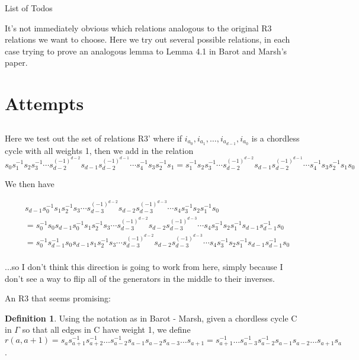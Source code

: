 \documentclass[11pt]{amsart}
\makeatletter
\theoremstyle{definition}
\newtheorem{defn}[thm]{Definition}
\def\listtodoname{List of Todos}
\def\listoftodos{\@starttoc{tdo}\listtodoname}
\makeatother
\begin{document}
\listoftodos
\newpage

It's not immediately obvious which relations analogous to the original R3 relations we want to choose.  Here we try out several possible relations, in each case trying to prove an analogous lemma to Lemma 4.1 in Barot and Marsh's paper.



\section{Attempts}

\subsection{}
Here we test out the set of relations R3' where if $i_{a_0}, i_{a_1},\ldots,i_{a_{d-1}},i_{a_0}$ is a chordless cycle with all weights 1, then we add in the relation 
$$s_0s_1^{-1}s_2s_3^{-1}\cdots s_{d-2}^{(-1)^{d-2}} s_{d-1}s_{d-2}^{(-1)^{d-1}}\cdots s_4^{-1}s_3s_2^{-1}s_1 = s_1^{-1}s_2s_3^{-1}\cdots s_{d-2}^{(-1)^{d-2}} s_{d-1}s_{d-2}^{(-1)^{d-1}}\cdots s_4^{-1}s_3s_2^{-1}s_1s_0$$


We then have

\begin{align*}
& s_{d-1}s_0^{-1}s_1s_2^{-1}s_3\cdots s_{d-3}^{(-1)^{d-2}} s_{d-2}s_{d-3}^{(-1)^{d-3}}\cdots s_4s_3^{-1}s_2s_1^{-1}s_0\\
&= s_0^{-1}s_0s_{d-1}s_0^{-1}s_1s_2^{-1}s_3\cdots s_{d-3}^{(-1)^{d-2}} s_{d-2}s_{d-3}^{(-1)^{d-3}}\cdots s_4s_3^{-1}s_2s_1^{-1}s_{d-1}s_{d-1}^{-1}s_0\\
&= s_0^{-1}s_{d-1}^{-1}s_0s_{d-1}s_1s_2^{-1}s_3\cdots s_{d-3}^{(-1)^{d-2}} s_{d-2}s_{d-3}^{(-1)^{d-3}}\cdots s_4s_3^{-1}s_2s_1^{-1}s_{d-1}s_{d-1}^{-1}s_0\\
\end{align*}


...so I don't think this direction is going to work from here, simply because I don't see a way to flip all of the generators in the middle to their inverses.

An R3 that seems promising:

\begin{defn}
Using the notation as in Barot - Marsh, given a chordless cycle C in $\Gamma$ so that all edges in C have weight 1, we define $r(a, a+1) = s_{a}s_{a+1}^{-1}s_{a+2}^{-1}\dots s_{a-2}^{-1}s_{a-1}s_{a-2}s_{a-3}\dots s_{a+1} = s_{a+1}^{-1}\dots s_{a-3}^{-1}s_{a-2}^{-1}s_{a-1}s_{a-2}\dots s_{a+1}s_{a}$.
\end{defn}
\end{document}
